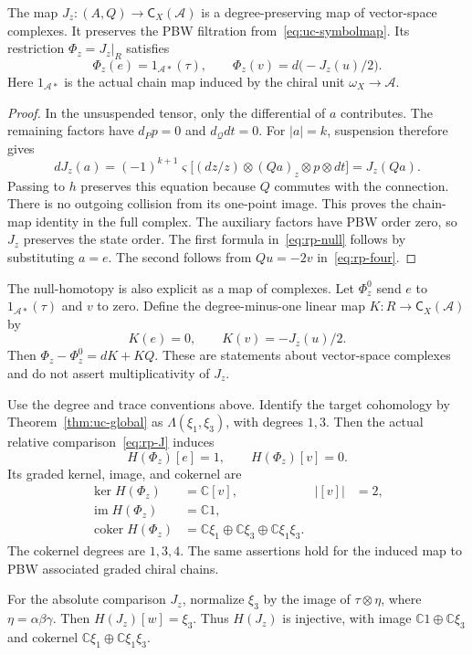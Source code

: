 \begin{proposition}\label{prop:rp-J}
The map $J_z:(A,Q)\to\mathsf C_X(\mathcal A)$ is a degree-preserving map of vector-space complexes.
It preserves the PBW filtration from~\eqref{eq:uc-symbolmap}.
Its restriction $\Phi_z=J_z|_R$ satisfies
\begin{equation}\label{eq:rp-null}
 \Phi_z(e)=1_{\mathcal A*}(\tau),\qquad
 \Phi_z(v)=d\bigl(-J_z(u)/2\bigr).
\end{equation}
Here $1_{\mathcal A*}$ is the actual chain map induced by the chiral unit $\omega_X\to\mathcal A$.
\end{proposition}

\begin{proof}
In the unsuspended tensor, only the differential of $a$ contributes.
The remaining factors have $d_Pp=0$ and $d_{\mathcal Q}dt=0$.
For $|a|=k$, suspension therefore gives
\[
 dJ_z(a)=(-1)^{k+1}\varsigma
 \bigl[(dz/z)\otimes(Qa)_z\otimes p\otimes dt\bigr]
 =J_z(Qa).
\]
Passing to $h$ preserves this equation because $Q$ commutes with the connection.
There is no outgoing collision from its one-point image.
This proves the chain-map identity in the full complex.
The auxiliary factors have PBW order zero, so $J_z$ preserves the state order.
The first formula in~\eqref{eq:rp-null} follows by substituting $a=e$.
The second follows from $Qu=-2v$ in~\eqref{eq:rp-four}.
\end{proof}

The null-homotopy is also explicit as a map of complexes.
Let $\Phi_z^0$ send $e$ to $1_{\mathcal A*}(\tau)$ and $v$ to zero.
Define the degree-minus-one linear map $K:R\to\mathsf C_X(\mathcal A)$ by
\[
 K(e)=0,\qquad K(v)=-J_z(u)/2.
\]
Then $\Phi_z-\Phi_z^0=dK+KQ$.
These are statements about vector-space complexes and do not assert multiplicativity of $J_z$.

\begin{theorem}\label{thm:rp-images}
Use the degree and trace conventions above.
Identify the target cohomology by Theorem~\ref{thm:uc-global} as
$\Lambda(\xi_1,\xi_3)$, with degrees $1,3$.
Then the actual relative comparison~\eqref{eq:rp-J} induces
\[
 H(\Phi_z)[e]=1,\qquad H(\Phi_z)[v]=0.
\]
Its graded kernel, image, and cokernel are
\begin{align*}
 \ker H(\Phi_z)&=\mathbb C[v], & |[v]|&=2,\\
 \operatorname{im}H(\Phi_z)&=\mathbb C1,\\
 \operatorname{coker}H(\Phi_z)&=
 \mathbb C\xi_1\oplus\mathbb C\xi_3\oplus\mathbb C\xi_1\xi_3.
\end{align*}
The cokernel degrees are $1,3,4$.
The same assertions hold for the induced map to PBW associated graded chiral chains.

For the absolute comparison $J_z$, normalize $\xi_3$ by the image of $\tau\otimes\eta$, where $\eta=\alpha\beta\gamma$.
Then $H(J_z)[w]=\xi_3$.
Thus $H(J_z)$ is injective, with image $\mathbb C1\oplus\mathbb C\xi_3$ and cokernel $\mathbb C\xi_1\oplus\mathbb C\xi_1\xi_3$.
\end{theorem}

